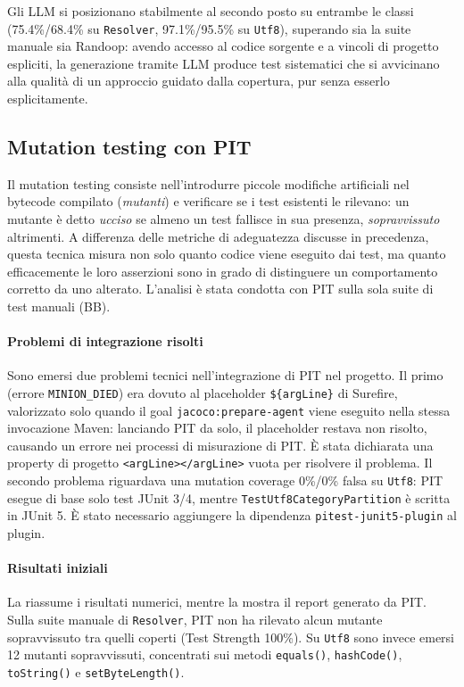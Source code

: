 Gli LLM si posizionano stabilmente al secondo posto su entrambe le
classi (75.4\%/68.4\% su \texttt{Resolver}, 97.1\%/95.5\% su
\texttt{Utf8}), superando sia la suite manuale sia Randoop: avendo
accesso al codice sorgente e a vincoli di progetto espliciti, la
generazione tramite LLM produce test sistematici che si avvicinano
alla qualità di un approccio guidato dalla copertura, pur senza
esserlo esplicitamente.


\subsection{Mutation testing con PIT}\label{sec:mutation}

Il mutation testing consiste nell'introdurre piccole modifiche
artificiali nel bytecode compilato (\emph{mutanti}) e verificare se i
test esistenti le rilevano: un mutante è detto \emph{ucciso} se
almeno un test fallisce in sua presenza, \emph{sopravvissuto}
altrimenti. A differenza delle metriche di adeguatezza discusse in
precedenza, questa tecnica misura non solo quanto codice viene
eseguito dai test, ma quanto efficacemente le loro asserzioni sono in
grado di distinguere un comportamento corretto da uno alterato.
L'analisi è stata condotta con PIT sulla sola suite di test manuali
(BB).
\paragraph{Problemi di integrazione risolti} Sono emersi due problemi
tecnici nell'integrazione di PIT nel progetto. Il primo (errore
\texttt{MINION\_DIED}) era dovuto al placeholder \texttt{\$\{argLine\}}
di Surefire, valorizzato solo quando il goal \texttt{jacoco:prepare-agent}
viene eseguito nella stessa invocazione Maven: lanciando PIT da solo,
il placeholder restava non risolto, causando un errore nei processi
di misurazione di PIT. È stata dichiarata una property di progetto
\texttt{<argLine></argLine>} vuota per risolvere il problema. Il
secondo problema riguardava una mutation coverage 0\%/0\% falsa su
\texttt{Utf8}: PIT esegue di base solo test JUnit 3/4, mentre
\texttt{TestUtf8CategoryPartition} è scritta in JUnit 5. È stato
necessario aggiungere la dipendenza \texttt{pitest-junit5-plugin} al
plugin.

\paragraph{Risultati iniziali} La  riassume i risultati numerici, mentre la
 mostra il report generato da PIT. Sulla suite manuale di \texttt{Resolver}, PIT
non ha rilevato alcun mutante sopravvissuto tra quelli coperti
(Test Strength 100\%). Su \texttt{Utf8} sono invece emersi 12 mutanti
sopravvissuti, concentrati sui metodi \texttt{equals()},
\texttt{hashCode()}, \texttt{toString()} e \texttt{setByteLength()}.

